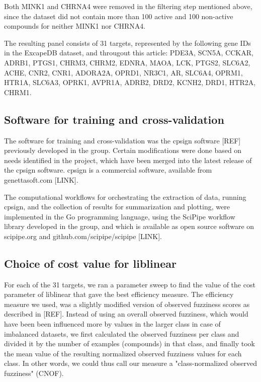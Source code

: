 \documentclass[utf8]{frontiersSCNS} %
\newcommand{\todoil}[1]{\todo[inline]{#1}}
\begin{document}
Both MINK1 and CHRNA4 were removed in the filtering step mentioned above, since
the dataset did not contain more than 100 active and 100 non-active compounds
for neither MINK1 nor CHRNA4.

The resulting panel consists of 31 targets, represented by the following gene
IDs in the ExcapeDB dataset, and througout this article: PDE3A,
SCN5A, CCKAR, ADRB1, PTGS1, CHRM3, CHRM2, EDNRA, MAOA, LCK,
PTGS2, SLC6A2, ACHE, CNR2, CNR1, ADORA2A, OPRD1, NR3C1, AR,
SLC6A4, OPRM1, HTR1A, SLC6A3, OPRK1, AVPR1A, ADRB2, DRD2,
KCNH2, DRD1, HTR2A, CHRM1.

\subsection{Software for training and cross-validation}

The software for training and cross-validation was the cpsign software [REF]
previously developed in the group. Certain modifications were done based on
needs identified in the project, which have been merged into the latest
release of the cpsign software. cpsign is a commercial software, available
from genettasoft.com [LINK]. \todoil{Add something about academic licenses?}

The computational workflows for orchestrating the extraction of data, running
cpsign, and the collection of results for summarization and plotting, were
implemented in the Go programming language, using the SciPipe workflow library
developed in the group, and which is available as open source software on
scipipe.org and github.com/scipipe/scipipe [LINK].

\subsection{Choice of cost value for liblinear}

For each of the 31 targets, we ran a parameter sweep to find the value of the
cost parameter of liblinear that gave the best efficiency measure. The
efficiency measure we used, was a slightly modified version of observed
fuzziness scores as described in [REF]. Instead of using an overall observed
fuzziness, which would have been been influenced more by values in the larger
class in case of imbalanced datasets, we first calculated the observed
fuzziness per class and divided it by the number of examples (compounds) in
that class, and finally took the mean value of the resulting normalized
observed fuzziness values for each class. In other words, we could thus call
our measure a "class-normalized observed fuzziness" (CNOF).
\end{document}
